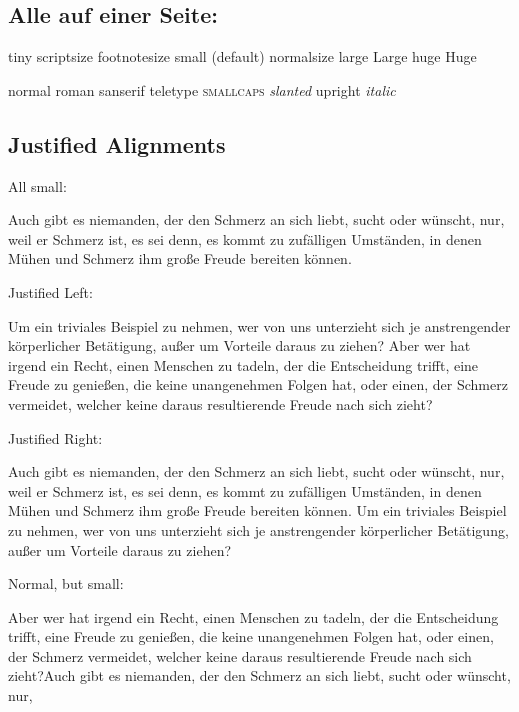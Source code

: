 \documentclass[]{article}
\begin{document}
\hypertarget{alle-auf-einer-seite}{%
\subsection{Alle auf einer Seite:}\label{alle-auf-einer-seite}}

{{\tiny{}tiny}} {{\scriptsize{}scriptsize}}
{{\footnotesize{}footnotesize}} {{\small{}small}} (default)
{{\normalsize{}normalsize}} {{\Large{}large}} {{\Large{}Large}}
{{\huge{}huge}} {{\Huge{}Huge}}

{{\normalfont{}normal}} {{\rmfamily{}roman}} {{\sffamily{}sanserif}}
{{\ttfamily{}teletype}} \textsc{smallcaps} {{\slshape{}slanted}}
{{\upshape{}upright}} {{\itshape{}italic}}

\hypertarget{justified-alignments}{%
\subsection{Justified Alignments}\label{justified-alignments}}

All small:

{\small{}

Auch gibt es niemanden, der den Schmerz an sich liebt, sucht oder
wünscht, nur, weil er Schmerz ist, es sei denn, es kommt zu zufälligen
Umständen, in denen Mühen und Schmerz ihm große Freude bereiten können.

Justified Left:


\begin{flushright}

Um ein triviales Beispiel zu nehmen, wer von uns unterzieht sich je
anstrengender körperlicher Betätigung, außer um Vorteile daraus zu
ziehen? Aber wer hat irgend ein Recht, einen Menschen zu tadeln, der die
Entscheidung trifft, eine Freude zu genießen, die keine unangenehmen
Folgen hat, oder einen, der Schmerz vermeidet, welcher keine daraus
resultierende Freude nach sich zieht?


\end{flushright}

Justified Right:


\begin{flushleft}

Auch gibt es niemanden, der den Schmerz an sich liebt, sucht oder
wünscht, nur, weil er Schmerz ist, es sei denn, es kommt zu zufälligen
Umständen, in denen Mühen und Schmerz ihm große Freude bereiten können.
Um ein triviales Beispiel zu nehmen, wer von uns unterzieht sich je
anstrengender körperlicher Betätigung, außer um Vorteile daraus zu
ziehen?


\end{flushleft}

Normal, but small:

Aber wer hat irgend ein Recht, einen Menschen zu tadeln, der die
Entscheidung trifft, eine Freude zu genießen, die keine unangenehmen
Folgen hat, oder einen, der Schmerz vermeidet, welcher keine daraus
resultierende Freude nach sich zieht?Auch gibt es niemanden, der den
Schmerz an sich liebt, sucht oder wünscht, nur,

}
\end{document}
